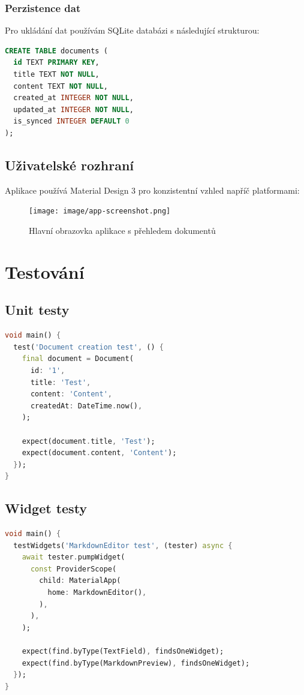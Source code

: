\documentclass[12pt, a4paper,
twoside,        %
openright
]{report}
\begin{document}
\subsection{Perzistence dat}
Pro ukládání dat používám SQLite databázi s následující strukturou:

\begin{lstlisting}[language=SQL, caption={Struktura databáze}, label={lst:db}]
CREATE TABLE documents (
  id TEXT PRIMARY KEY,
  title TEXT NOT NULL,
  content TEXT NOT NULL,
  created_at INTEGER NOT NULL,
  updated_at INTEGER NOT NULL,
  is_synced INTEGER DEFAULT 0
);
\end{lstlisting}

\section{Uživatelské rozhraní}
Aplikace používá Material Design 3 pro konzistentní vzhled napříč platformami:

\begin{figure}[h]
    \centering
    \texttt{[image: image/app-screenshot.png]}
    \caption{Hlavní obrazovka aplikace s přehledem dokumentů}
    \label{fig:main-screen}
\end{figure}

\chapter{Testování}
\label{chap:testovani}

\section{Unit testy}
\begin{lstlisting}[language=Dart, caption={Příklad unit testu}]
void main() {
  test('Document creation test', () {
    final document = Document(
      id: '1',
      title: 'Test',
      content: 'Content',
      createdAt: DateTime.now(),
    );
    
    expect(document.title, 'Test');
    expect(document.content, 'Content');
  });
}
\end{lstlisting}

\section{Widget testy}
\begin{lstlisting}[language=Dart, caption={Widget test}]
void main() {
  testWidgets('MarkdownEditor test', (tester) async {
    await tester.pumpWidget(
      const ProviderScope(
        child: MaterialApp(
          home: MarkdownEditor(),
        ),
      ),
    );

    expect(find.byType(TextField), findsOneWidget);
    expect(find.byType(MarkdownPreview), findsOneWidget);
  });
}
\end{lstlisting}
\end{document}
